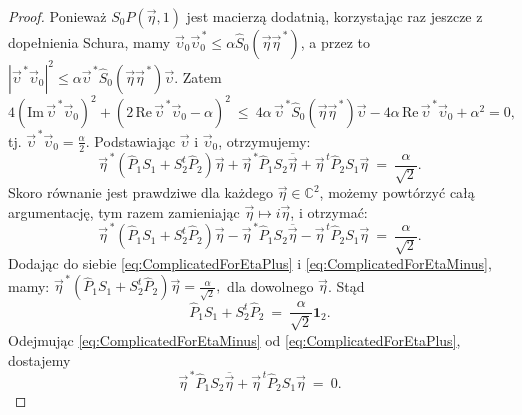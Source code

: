 {\begin{proof}
Ponieważ $S_{0} P(\vec{\eta},1)$ jest macierzą dodatnią,
korzystając raz jeszcze z dopełnienia Schura, mamy
$\vec{\upsilon}_{0} \vec{\upsilon}_{0}^{\,*} \leq  \alpha \hat{S}_{0}(\vec{\eta} \vec{\eta}^{\,*})$,
a przez to
$|\vec{\upsilon}^{\,*} \vec{\upsilon}_{0}|^{2} \leq
  \alpha \vec{\upsilon}^{\,*} \hat{S}_{0}(\vec{\eta} \vec{\eta}^{\,*}) \vec{\upsilon}$.
Zatem
\begin{equation}
4 \left( \text{Im} \, \vec{\upsilon}^{\,*} \vec{\upsilon}_{0} \right)^{2} +
\left( 2 \, \text{Re} \, \vec{\upsilon}^{\,*} \vec{\upsilon}_{0} - \alpha \right)^{2}
 \: \leq \:
4 \alpha \, \vec{\upsilon}^{\,*} \hat{S}_{0}(\vec{\eta} \vec{\eta}^{\,*}) \vec{\upsilon}
    - 4 \alpha \, \text{Re} \, \vec{\upsilon}^{\,*} \vec{\upsilon}_{0} + \alpha^{2}  = 0,
\end{equation}
tj. $\vec{\upsilon}^{\,*} \vec{\upsilon}_{0} = \frac{\alpha}{2}$.
Podstawiając $\vec{\upsilon}$ i $\vec{\upsilon}_{0}$,
otrzymujemy:
\begin{equation}
\label{eq:ComplicatedForEtaPlus}
\vec{\eta}^{\,*} \left( \hat{P}_{1} S_{1} + S_{2}^{t} \hat{P}_{2} \right) \vec{\eta}
    + \vec{\eta}^{\,*} \hat{P}_{1} S_{2} \overline{\vec{\eta}}
    + \vec{\eta}^{\,t} \hat{P}_{2} S_{1} \vec{\eta} \: = \: \frac{\alpha}{\sqrt{2}}.
\end{equation}
Skoro równanie jest prawdziwe dla każdego  $\vec{\eta} \in \mathbb{C}^{2}$,
możemy powtórzyć całą argumentację, tym razem zamieniając
$\vec{\eta} \mapsto i \vec{\eta}$,
i otrzymać:
\begin{equation}
\label{eq:ComplicatedForEtaMinus}
\vec{\eta}^{\,*} \left( \hat{P}_{1} S_{1} + S_{2}^{t} \hat{P}_{2} \right) \vec{\eta}
    - \vec{\eta}^{\,*} \hat{P}_{1} S_{2} \overline{\vec{\eta}}
    - \vec{\eta}^{\,t} \hat{P}_{2} S_{1} \vec{\eta} \: = \: \frac{\alpha}{\sqrt{2}}.
\end{equation}
Dodając do siebie
\eqref{eq:ComplicatedForEtaPlus} i \eqref{eq:ComplicatedForEtaMinus},
mamy:
$
\vec{\eta}^{\,*} \left( \hat{P}_{1} S_{1} + S_{2}^{t} \hat{P}_{2} \right) \vec{\eta} =
    \frac{\alpha}{\sqrt{2}},
$
dla dowolnego $\vec{\eta}$.
Stąd
\begin{equation}
\label{eq:S1PlusS2EqualsOne}
\hat{P}_{1} S_{1} + S_{2}^{t} \hat{P}_{2} \: = \:
     \frac{\alpha}{\sqrt{2}} \mathbf{1}_{2}.
\end{equation}
Odejmując \eqref{eq:ComplicatedForEtaMinus} od
\eqref{eq:ComplicatedForEtaPlus},
dostajemy
\begin{equation}
    \vec{\eta}^{\,*} \hat{P}_{1} S_{2} \overline{\vec{\eta}}
    + \vec{\eta}^{\,t} \hat{P}_{2} S_{1} \vec{\eta} \: = \: 0.

\end{equation}
\end{proof}}
